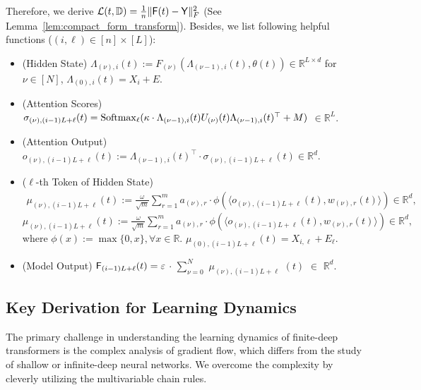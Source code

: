 \documentclass[11pt]{article}
\theoremstyle{plain}
\newcommand{\R}{\mathbb{R}}
\begin{document}
Therefore, we derive ${\cal L}(t, \mathbb{D}) = \frac{1}{n} \| {\sf F}(t) - {\sf Y}\|_F^2$ (See Lemma~\ref{lem:compact_form_transform}). Besides, we list following helpful functions ($(i, \ell) \in [n] \times [L]$):
\begin{itemize}
        \item (Hidden State) $\Lambda_{(\nu), i}(t) := F_{(\nu)}(\Lambda_{(\nu-1), i}(t), \theta(t)) \in \R^{L \times d}$ for $\nu \in [N]$, $\Lambda_{(0), i}(t) = X_{i} + E$.
        \item (Attention Scores) $ \sigma_{(\nu), (i-1)L+\ell}(t) =  {\rm Softmax}_{\ell}( \kappa \cdot \Lambda_{(\nu-1), i}(t) U_{(\nu)}(t) \Lambda_{(\nu-1), i}(t)^\top + M ) $ $ \in \R^{L}$.
        \item (Attention Output) $o_{(\nu), (i-1)L+\ell}(t) := \Lambda_{(\nu-1), i}(t)^\top \cdot \sigma_{(\nu), (i-1)L+\ell}(t) \in \R^d$.
        \item ($\ell$-th Token of Hidden State)
        \ifdefined\isarxiv
        \begin{align*}
            \mu_{(\nu), (i-1)L+\ell}(t) := \frac{\omega}{\sqrt{m}} \sum_{r=1}^m a_{(\nu), r} \cdot  \phi( \langle o_{(\nu), (i-1)L+\ell}(t), w_{(\nu), r}(t) \rangle) \in \R^d,
        \end{align*}
        \else
        $\mu_{(\nu), (i-1)L+\ell}(t) := \frac{\omega}{\sqrt{m}} \sum_{r=1}^m a_{(\nu), r} \cdot  \phi( \langle o_{(\nu), (i-1)L+\ell}(t), w_{(\nu), r}(t) \rangle) \in \R^d,$
        \fi
        where $\phi(x) := \max\{0, x\}, \forall x \in \R$. $\mu_{(0), (i-1)L+\ell}(t) = X_{i, \ell} + E_\ell$.
        \item (Model Output) ${\sf F}_{(i-1)L+\ell}(t) = \varepsilon $ $ \cdot $ $ \sum_{\nu=0}^N $ $\mu_{(\nu), (i-1)L+\ell}$ $(t) $ $  \in  $ $\R^{d}$.
    \end{itemize}



\subsection{Key Derivation for Learning Dynamics}\label{sub:learning_dynamics}
The primary challenge in understanding the learning dynamics of finite-deep transformers is the complex analysis of gradient flow, which differs from the study of shallow or infinite-deep neural networks. We overcome the complexity by cleverly utilizing the multivariable chain rules. 
\end{document}
